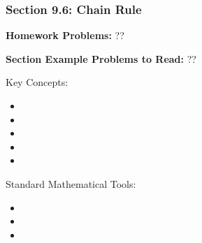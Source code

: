 %
% 

\begin{frame}
\frametitle{\Large {\color[rgb]{0.02,0.20,1.0} Section 9.6: Chain Rule}}
\scriptsize

\vspace{0.2cm}
{\bf Homework Problems:} \quad ??

\vspace{0.2cm}

{\bf Section Example Problems to Read:} \quad ??

\vspace{0.2cm}

\begin{block}{Key Concepts:}
\begin{itemize}
	\item[...] 
	\item[...] 
	\item[...] 
	\item[...] 
	\item[...] 
\end{itemize}
\end{block}

\begin{block}{Standard Mathematical Tools:}
\begin{itemize}
	\item[...] 
	\item[...] 
	\item[...] 
\end{itemize}
\end{block}

\end{frame}
